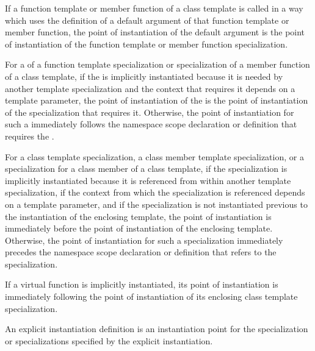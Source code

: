 \pnum
If a function template or member function of a class template is called
in a way which uses the definition of a default argument of that function
template or member function,
the point of instantiation of the default argument is the point of
instantiation of the function template or member function specialization.

\pnum
For a  of a function template
specialization or specialization of a member function of a class template, if
the  is implicitly instantiated because
it is needed by another template specialization and the context that requires
it depends on a template parameter, the point of instantiation of the
 is the point of instantiation of the
specialization that requires it. Otherwise, the point of instantiation for such
a  immediately follows the namespace
scope declaration or definition that requires the
.



\pnum
For a class template specialization, a class member template specialization,
or a specialization for a class member of a class template,
if the specialization is implicitly instantiated because it is referenced
from within another template specialization,
if the context from which the specialization is referenced depends on a
template parameter,
and if the specialization is not instantiated previous to the instantiation of
the enclosing template,
the point of instantiation is immediately before the point of instantiation of
the enclosing template.
Otherwise, the point of instantiation for such a specialization immediately
precedes the namespace scope declaration
or definition that refers to the specialization.

\pnum
If a virtual function is implicitly instantiated, its point of instantiation
is immediately following the point of instantiation of its enclosing class
template specialization.

\pnum
An explicit instantiation definition is an instantiation
point for the specialization or specializations specified by the explicit
instantiation.

